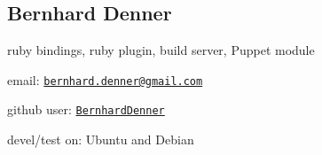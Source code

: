 \subsection*{Bernhard Denner}

ruby bindings, ruby plugin, build server, Puppet module


\begin{DoxyItemize}
\item email\+: \href{mailto:bernhard.denner@gmail.com}{\tt bernhard.\+denner@gmail.\+com}
\item github user\+: \href{https://github.com/BernhardDenner}{\tt Bernhard\+Denner}
\item devel/test on\+: Ubuntu and Debian 
\end{DoxyItemize}
